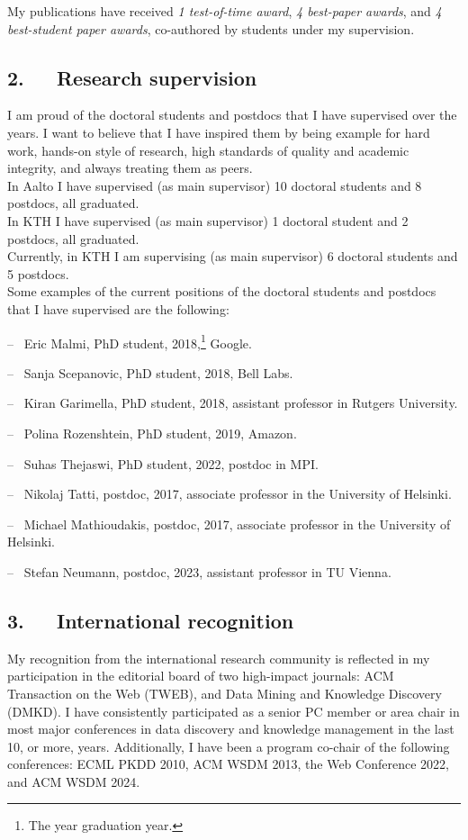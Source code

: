 \documentclass[a4paper,11pt]{article}
\begin{document}
My publications have received \emph{1 test-of-time award}, 
\emph{4 best-paper awards}, 
and \emph{4 best-student paper awards}, co-authored by students under my supervision. 


\subsection*{2.~~~Research supervision}

I am proud of the doctoral students and postdocs that I have supervised over the years. 
I want to believe that I have inspired them by being example for hard work,
hands-on style of research, 
high standards of quality and academic integrity, 
and always treating them as peers. \\
In Aalto I have supervised (as main supervisor) 10 doctoral students and 8 postdocs, all graduated. \\
In KTH I have supervised (as main supervisor) 1 doctoral student and 2 postdocs, all graduated. \\
Currently, in KTH I am supervising (as main supervisor) 6 doctoral students and 5 postdocs. \\
Some examples of the current positions of the doctoral students and postdocs that I have supervised are the following:
\squishlist
\item[--~] Eric Malmi, PhD student, 2018,\footnote{The year graduation year.} Google.
\item[--~] Sanja Scepanovic, PhD student, 2018, Bell Labs.
\item[--~] Kiran Garimella, PhD student, 2018, assistant professor in Rutgers University.
\item[--~] Polina Rozenshtein, PhD student, 2019, Amazon.
\item[--~] Suhas Thejaswi, PhD student, 2022, postdoc in MPI.
\item[--~] Nikolaj Tatti, postdoc, 2017, associate professor in the University of Helsinki.
\item[--~] Michael Mathioudakis,  postdoc, 2017, associate professor in the University of Helsinki.
\item[--~] Stefan Neumann, postdoc, 2023, assistant professor in TU Vienna.
\squishend

\subsection*{3.~~~International recognition}

My recognition from the international research community is reflected 
in my participation in the editorial board of two high-impact journals: 
ACM Transaction on the Web (TWEB), and Data Mining and Knowledge Discovery (DMKD). 
I have consistently participated as a senior PC member or area chair in 
most major conferences in data discovery and knowledge management in the last 10, or more, years.
Additionally, I have been a program co-chair of the following conferences:
ECML PKDD 2010, ACM WSDM 2013, the Web Conference 2022, and ACM WSDM 2024. 
\end{document}
